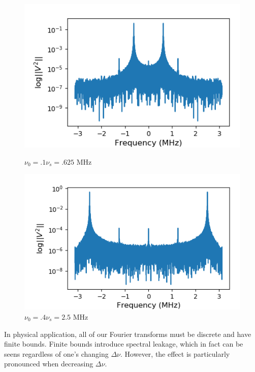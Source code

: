 \documentclass[a4paper]{article}
\begin{document}
\begin{figure}
\centering
\begin{minipage}{.5\textwidth}
	\centering
	\includegraphics[width=\linewidth]{5-4/t1_eighth}
	\caption{$\nu_0 = .1 \nu_s = .625$ MHz}
	\label{fig:tenth_leakage}
\end{minipage}%
\begin{minipage}{.5\textwidth}
	\centering
	\includegraphics[width=\linewidth]{5-4/t4_eighth}
	\caption{$\nu_0 = .4 \nu_s = 2.5$ MHz}
	\label{fig:4tenths_leakage}
\end{minipage}
\end{figure}


In physical application, all of our Fourier transforms must be discrete and have finite bounds. Finite bounds introduce spectral leakage, which in fact can be seens regardless of one's changing $\Delta \nu$. However, the effect is particularly pronounced when decreasing $\Delta \nu$. 
\end{document}
